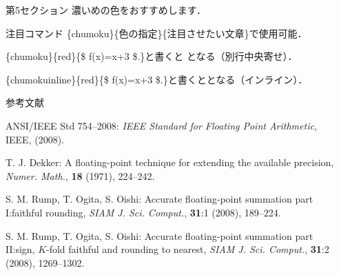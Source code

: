 \documentclass[final,dvipdfmx]{beamer}
\begin{document}
\begin{frame}[t]
\begin{columns}[T]
\begin{column}{.495\linewidth}
\end{column}


\begin{column}{.495\linewidth}


\begin{Colorbox}[black]{第5セクション}
	濃いめの色をおすすめします．
\end{Colorbox}


\begin{Colorbox}{\Large 注目コマンド}
	\yen \{chumoku\}\{色の指定\}\{注目させたい文章\}で使用可能．\vspace{2cm}

	\yen \{chumoku\}\{red\}\{\$ f(x)=x+3 \$.\}と書くと
	となる（別行中央寄せ）．\vspace{2cm}

	\yen \{chumokuinline\}\{red\}\{\$ f(x)=x+3 \$.\}と書くととなる（インライン）．
\end{Colorbox}


\begin{Colorbox}{参考文献}
	\begin{thebibliography}{99}
		
		\beamertemplatetextbibitems
		ANSI/IEEE Std 754--2008: 
		{\em IEEE Standard for Floating Point Arithmetic}, 
		IEEE, 
		(2008).
		
		T. J. Dekker: 
		A floating-point technique for extending the available precision, 
		{\em Numer. Math.}, 
		\textbf{18} (1971), 224--242.
		
		S. M. Rump, T. Ogita, S. Oishi: 
		Accurate floating-point summation part I:faithful rounding, 
		{\em SIAM J. Sci. Comput.}, 
		\textbf{31}:1 (2008), 189--224.
		
		S. M. Rump, T. Ogita, S. Oishi: 
		Accurate floating-point summation part II:sign, $K$-fold faithful and rounding to nearest, 
		{\em SIAM J. Sci. Comput.}, 
		\textbf{31}:2 (2008), 1269--1302.
	\end{thebibliography}
\end{Colorbox}

\end{column}

\end{columns}
\end{frame}
\end{document}
